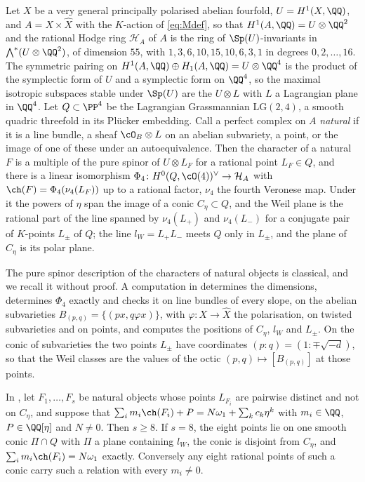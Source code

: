 \begin{setupenv}\label{setup:lagquadric}
Let $X$ be a very general principally polarised abelian fourfold,
$U=H^{1}(X,\QQ)$, and $A=X\times\widehat{X}$ with the $K$-action of
\eqref{eq:Mdef}, so that $H^{1}(A,\QQ)=U\otimes\QQ^{2}$ and the rational Hodge
ring $\mathcal{H}_{A}$ of $A$ is the ring of $\Sp(U)$-invariants in
$\bigwedge^{*}(U\otimes\QQ^{2})$, of dimension $55$, with
$1,3,6,10,15,10,6,3,1$ in degrees $0,2,\dots,16$. The symmetric pairing on
$H^{1}(A,\QQ)\oplus H_{1}(A,\QQ)=U\otimes\QQ^{4}$ is the product of the
symplectic form of $U$ and a symplectic form on $\QQ^{4}$, so the maximal
isotropic subspaces stable under $\Sp(U)$ are the $U\otimes L$ with $L$ a
Lagrangian plane in $\QQ^{4}$. Let $Q\subset\PP^{4}$ be the Lagrangian
Grassmannian $\mathrm{LG}(2,4)$, a smooth quadric threefold in its
Pl\"ucker embedding. Call a perfect complex on $A$ \emph{natural} if it is a line
bundle, a sheaf $\cO_{B}\otimes L$ on an abelian subvariety, a point, or the
image of one of these under an autoequivalence. Then the character of a natural
$F$ is a multiple of the pure spinor of $U\otimes L_{F}$ for a rational point
$L_{F}\in Q$, and there is a linear isomorphism
$\Phi_{4}\colon H^{0}(Q,\cO(4))^{\vee}\to\mathcal{H}_{A}$ with
$\ch(F)=\Phi_{4}(\nu_{4}(L_{F}))$ up to a rational factor, $\nu_{4}$ the
fourth Veronese map. Under it the powers of $\eta$ span the image of a conic
$C_{\eta}\subset Q$, and the Weil plane is the rational part of the line
spanned by $\nu_{4}(L_{+})$ and $\nu_{4}(L_{-})$ for a conjugate pair of
$K$-points $L_{\pm}$ of $Q$; the line $l_{W}=L_{+}L_{-}$ meets $Q$ only in
$L_{\pm}$, and the plane of $C_{\eta}$ is its polar plane.
\end{setupenv}

The pure spinor description of the characters of natural objects is
classical, and we recall it without proof. A computation in \cite{BMB26} determines the dimensions, determines $\Phi_{4}$
exactly and checks it on line bundles of every
slope, on the abelian subvarieties $B_{(p,q)}=\{(px,q\varphi x)\}$, with
$\varphi\colon X\to\widehat{X}$ the polarisation, on twisted subvarieties and
on points, and computes the positions of $C_{\eta}$, $l_{W}$ and $L_{\pm}$. On
the conic of subvarieties the two points $L_{\pm}$ have coordinates
$(p:q)=(1:\mp\sqrt{-d})$, so that the Weil classes are the values of the
octic $(p,q)\mapsto[B_{(p,q)}]$ at those points.

\begin{theorem}[Minimal support at $n=4$]\label{thm:minimalsupport}
In , let $F_{1},\dots,F_{s}$ be natural objects whose
points $L_{F_{i}}$ are pairwise distinct and not on $C_{\eta}$, and suppose
that $\sum_{i}m_{i}\ch(F_{i})+P=N\omega_{1}+\sum_{k}c_{k}\eta^{k}$ with
$m_{i}\in\QQ$, $P\in\QQ[\eta]$ and $N\ne0$. Then $s\ge8$. If $s=8$, the eight
points lie on one smooth conic $\Pi\cap Q$ with $\Pi$ a plane containing
$l_{W}$, the conic is disjoint from $C_{\eta}$, and
$\sum_{i}m_{i}\ch(F_{i})=N\omega_{1}$ exactly. Conversely any eight rational
points of such a conic carry such a relation with every $m_{i}\ne0$.
\end{theorem}

